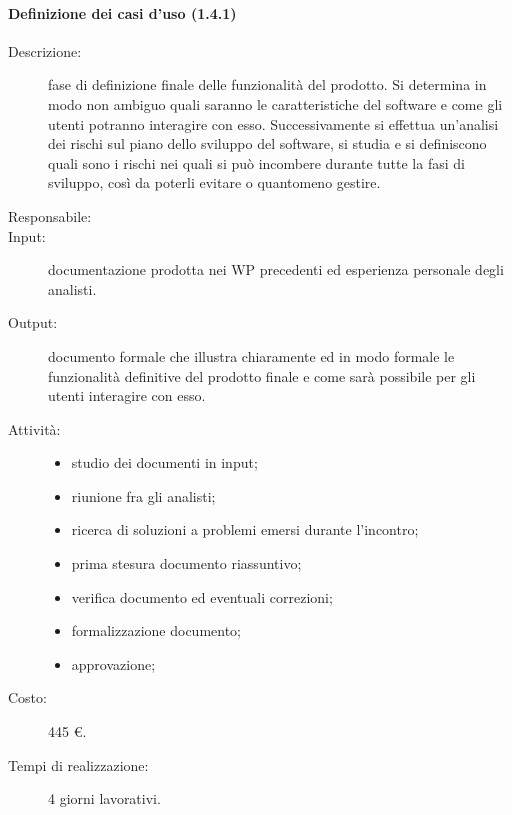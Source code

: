 \paragraph{Definizione dei casi d'uso (1.4.1)}
\begin{description}
\item[Descrizione:]fase di definizione finale delle funzionalità del prodotto. Si determina in modo non ambiguo quali saranno le caratteristiche del software e come gli utenti potranno interagire con esso. Successivamente si effettua un'analisi dei rischi sul piano dello sviluppo del software, si studia e si definiscono quali sono i rischi nei quali si può incombere durante tutte la fasi di sviluppo, così da poterli evitare o quantomeno gestire.
\item[Responsabile:] 
\item[Input: ]documentazione prodotta nei WP precedenti ed esperienza personale degli analisti.
\item[Output:] documento formale che illustra chiaramente ed in modo formale le funzionalità definitive del prodotto finale e come sarà possibile per gli utenti interagire con esso.
\item[Attività:] 
\begin{center}
\begin{itemize}
\item studio dei documenti in input;
\item riunione fra gli analisti;
\item ricerca di soluzioni a problemi emersi durante l'incontro;
\item prima stesura documento riassuntivo;
\item verifica documento ed eventuali correzioni;
\item formalizzazione documento;
\item approvazione;
\end{itemize}
\end{center}
\item[Costo:] 445 \euro{}.
\item[Tempi di realizzazione:] 4 giorni lavorativi.
\end{description}

